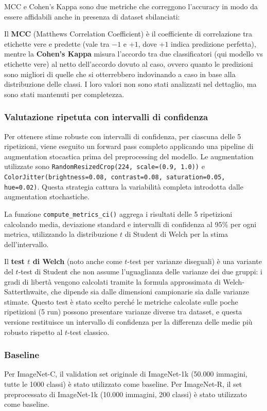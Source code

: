 MCC e Cohen's Kappa sono due metriche che correggono l'accuracy in modo da essere affidabili anche in presenza di dataset sbilanciati:

Il \textbf{MCC} (Matthews Correlation Coefficient) è il coefficiente di correlazione tra etichette vere e predette (vale tra $-1$ e $+1$, dove $+1$ indica predizione perfetta), mentre la \textbf{Cohen's Kappa} misura l'accordo tra due classificatori (qui modello vs etichette vere) al netto dell'accordo dovuto al caso, ovvero quanto le predizioni sono migliori di quelle che si otterrebbero indovinando a caso in base alla distribuzione delle classi. I loro valori non sono stati analizzati nel dettaglio, ma sono stati mantenuti per completezza.


\subsubsection{Valutazione ripetuta con intervalli di confidenza}
Per ottenere stime robuste con intervalli di confidenza, per ciascuna delle 5 ripetizioni, viene eseguito un forward pass completo applicando una pipeline di augmentation stocastica prima del preprocessing del modello.
Le augmentation utilizzate sono \texttt{RandomResizedCrop(224, scale=(0.9, 1.0))} e \\
\texttt{ColorJitter(brightness=0.08, contrast=0.08, saturation=0.05, hue=0.02)}. Questa strategia cattura la variabilità completa introdotta dalle augmentation stochastiche.

La funzione \texttt{compute\_metrics\_ci()} aggrega i risultati delle 5 ripetizioni calcolando media, deviazione standard e intervalli di confidenza al 95\% per ogni metrica, utilizzando la distribuzione $t$ di Student di Welch per la stima dell'intervallo. 

Il \textbf{test $t$ di Welch} (noto anche come $t$-test per varianze diseguali) è una variante del $t$-test di Student che non assume l'uguaglianza delle varianze dei due gruppi: i gradi di libertà vengono calcolati tramite la formula approssimata di Welch-Satterthwaite, che dipende sia dalle dimensioni campionarie sia dalle varianze stimate. Questo test è stato scelto perché le metriche calcolate sulle poche ripetizioni (5 run) possono presentare varianze diverse tra dataset, e questa versione restituisce un intervallo di confidenza per la differenza delle medie più robusto rispetto al $t$-test classico.
\subsubsection{Baseline} Per ImageNet-C, il validation set originale di ImageNet-1k (50.000 immagini, tutte le 1000 classi) è stato utilizzato come baseline. Per ImageNet-R, il set preprocessato di ImageNet-1k (10.000 immagini, 200 classi) è stato utilizzato come baseline.

